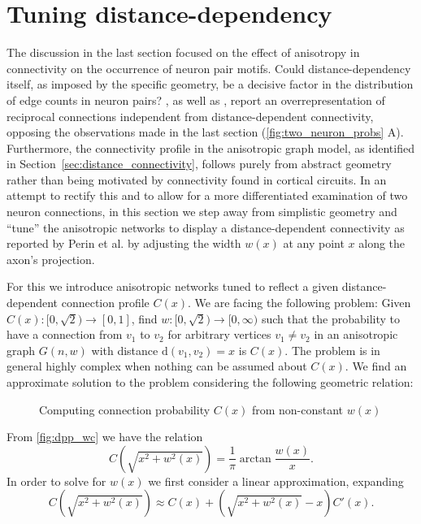 \newpage
\section{Tuning distance-dependency}\label{sec:tuned_networks}

The discussion in the last section focused on the effect of anisotropy
in connectivity on the occurrence of neuron pair motifs. Could
distance-dependency itself, as imposed by the specific geometry, be a
decisive factor in the distribution of edge counts in neuron pairs?
\textcite{Song2005}, as well as \textcite{Perin2011}, report an
overrepresentation of reciprocal connections independent from
distance-dependent connectivity, opposing the observations made in the
last section (\autoref{fig:two_neuron_probs} A). Furthermore, the
connectivity profile in the anisotropic graph model, as identified in
Section~\ref{sec:distance_connectivity}, follows purely from abstract
geometry rather than being motivated by connectivity found in cortical
circuits. In an attempt to rectify this and to allow for a more
differentiated examination of two neuron connections, in this section
we step away from simplistic geometry and \enquote{tune} the
anisotropic networks to display a distance-dependent connectivity as
reported by Perin et al. by adjusting the width $w(x)$ at any point
$x$ along the axon's projection.

For this we introduce anisotropic networks tuned to reflect a given
distance-dependent connection profile $C(x)$. We are facing the
following problem: Given $C(x):[0,\sqrt{2}) \to [0,1]$, find
$w:[0,\sqrt{2}) \to [0,\infty)$ such that the probability to have a
connection from $v_1$ to $v_2$ for arbitrary vertices $v_1 \neq v_2$
in an anisotropic graph $G(n,w)$ with distance $\mathrm{d}(v_1,v_2) =
x$ is $C(x)$. The problem is in general highly complex when nothing
can be assumed about $C(x)$. We find an approximate solution to the
problem considering the following geometric relation:

\begin{figure}[htp]
  \centering
  \caption{Computing connection probability $C(x)$ from non-constant
    $w(x)$}
  \label{fig:dpp_wc}
\end{figure}

From \autoref{fig:dpp_wc} we have the relation  
\begin{equation}
C\left(\sqrt{x^2+w^2(x)}\right) = \frac{1}{\pi} \operatorname{arctan}
\frac{w(x)}{x}. \label{eq:geo_rel}
\end{equation} 
In order to solve for $w(x)$ we first consider a linear approximation,
expanding
\[C\left(\sqrt{x^2+w^2(x)}\right) \approx C(x) + \left(\sqrt{x^2+w^2(x)} -
x\right) C'(x).\]

